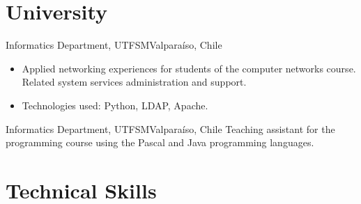 \documentclass[sans,letter]{moderncv}
\begin{document}
\section{University}

{Informatics Department, UTFSM}{Valparaíso, Chile}{}
{
\begin{itemize}
\item Applied networking experiences for students of the computer networks
course. Related system services administration and support.
\item Technologies used: Python, LDAP, Apache.
\end{itemize}
}

{Informatics Department, UTFSM}{Valparaíso, Chile}{}
{Teaching assistant for the programming course using the Pascal and Java programming
languages.}

\section{Technical Skills}
\end{document}
